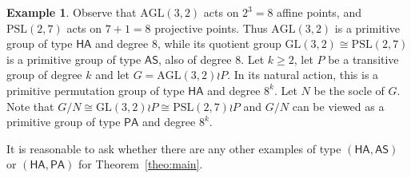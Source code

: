 \documentclass[twoside,12pt,leqno]{amsproc}
\numberwithin{table}{section}
\numberwithin{figure}{section}
\theoremstyle{plain}
\theoremstyle{definition}\newtheorem{definition}[theorem]{Definition}
\theoremstyle{definition}\newtheorem{example}[theorem]{Example}
\theoremstyle{definition}\newtheorem{construction}[theorem]{Construction}
\theoremstyle{definition}\newtheorem{remark}[theorem]{Remark}
\theoremstyle{definition}\newtheorem{problem}[theorem]{Problem}
\begin{document}
\begin{example}\label{Ex:HAASPA} 
Observe that ${\mathrm{AGL}}(3,2)$ acts on $2^3=8$ affine points, and ${\mathrm{PSL}}(2,7)$ acts on $7+1=8$ projective points. Thus ${\mathrm{AGL}}(3,2)$ is a primitive group of type ${\mathsf{HA}}$ and degree $8$, while its quotient group ${\mathrm{GL}}(3,2)\cong{\mathrm{PSL}}(2,7)$ is a primitive group of type ${\mathsf{AS}}$, also of degree $8$. Let $k{\geqslant} 2$, let $P$ be a transitive group of degree $k$ and let $G={\mathrm{AGL}}(3,2)\wr P$. In its natural action, this is a primitive permutation group of type ${\mathsf{HA}}$ and degree $8^k$. Let $N$ be the socle of $G$. Note that $G/N\cong {\mathrm{GL}}(3,2)\wr P\cong{\mathrm{PSL}}(2,7)\wr P$ and $G/N$ can be viewed as a primitive group of type ${\mathsf{PA}}$ and degree $8^k$.
\end{example}

It is reasonable to ask whether there are any other examples of type $({\mathsf{HA}},{\mathsf{AS}})$ or $({\mathsf{HA}},{\mathsf{PA}})$ for Theorem~\ref{theo:main}.
\end{document}
